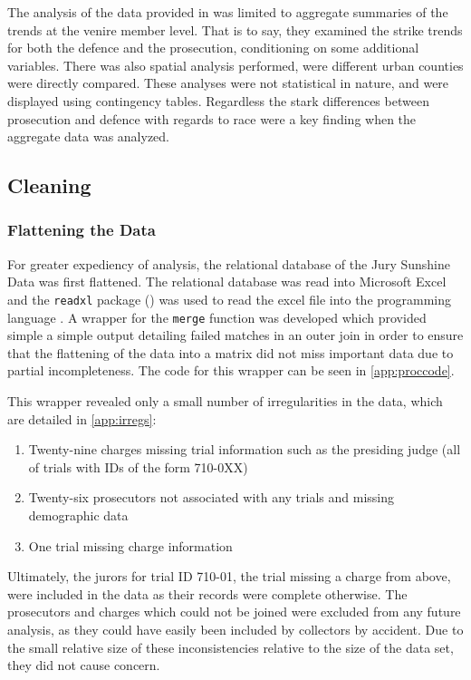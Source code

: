 The analysis of the data provided in \cite{JurySunshineProj} was limited to aggregate summaries of the trends at the venire
member level. That is to say, they examined the strike trends for both the defence and the prosecution, conditioning on some
additional variables. There was also spatial analysis performed, were different urban counties were directly compared. These
analyses were not statistical in nature, and were displayed using contingency tables. Regardless the stark differences between
prosecution and defence with regards to race were a key finding when the aggregate data was analyzed.

\subsection{Cleaning}

\subsubsection{Flattening the Data}

For greater expediency of analysis, the relational database of the Jury Sunshine Data was first flattened. The relational database
was read into Microsoft Excel and the \texttt{readxl} package (\cite{readxl}) was used to read the excel file into the programming
language \Rp. A wrapper for the \texttt{merge} function was developed which provided simple a simple output detailing failed
matches in an outer join in order to ensure that the flattening of the data into a matrix did not miss important data due to
partial incompleteness. The code for this wrapper can be seen in \ref{app:proccode}.

This wrapper revealed only a small number of irregularities in the data, which are detailed in \ref{app:irregs}:

\begin{enumerate}
\item Twenty-nine charges missing trial information such as the presiding judge (all of trials with IDs of the form 710-0XX)
\item Twenty-six prosecutors not associated with any trials and missing demographic data
\item One trial missing charge information
\end{enumerate}

Ultimately, the jurors for trial ID 710-01, the trial missing a charge from above, were included in the data as their records were
complete otherwise. The prosecutors and charges which could not be joined were excluded from any future analysis, as they could
have easily been included by collectors by accident. Due to the small relative size of these inconsistencies relative to the size
of the data set, they did not cause concern.

